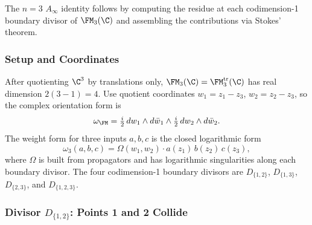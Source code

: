 The $n=3$ $A_\infty$ identity follows by computing the residue at each codimension-1 boundary divisor of $\FM_3(\C)$ and assembling the contributions via Stokes' theorem.

\subsubsection{Setup and Coordinates}

After quotienting \(\C^3\) by translations only,
\(\FM_3(\C)=\FM_3^{\mathrm{tr}}(\C)\) has real dimension \(2(3-1)=4\).
Use quotient coordinates \(w_1=z_1-z_3\), \(w_2=z_2-z_3\), so the
complex orientation form is
\[
\omega_{\FM} = \tfrac{i}{2}\, dw_1 \wedge d\bar{w}_1 \wedge \tfrac{i}{2}\, dw_2 \wedge d\bar{w}_2.
\]
The weight form for three inputs $a, b, c$ is the closed logarithmic form
\[
\omega_3(a,b,c) = \Omega(w_1, w_2) \cdot a(z_1)\, b(z_2)\, c(z_3),
\]
where $\Omega$ is built from propagators and has logarithmic singularities along each boundary divisor. The four codimension-1 boundary divisors are $D_{\{1,2\}}$, $D_{\{1,3\}}$, $D_{\{2,3\}}$, and $D_{\{1,2,3\}}$.

\subsubsection{Divisor $D_{\{1,2\}}$: Points 1 and 2 Collide}


